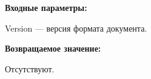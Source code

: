 \textbf{Входные параметры:}

Version --- версия формата документа.

\textbf{Возвращаемое значение:}

Отсутствуют.